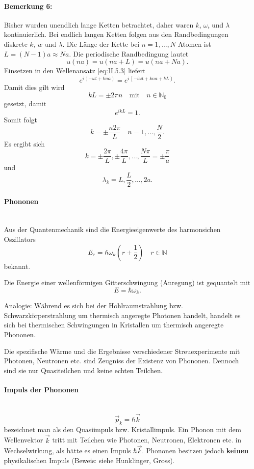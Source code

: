 \paragraph{Bemerkung 6:}
	Bisher wurden unendlich lange Ketten betrachtet, daher waren $k$, $\omega$, und $\lambda$ kontinuierlich.
	Bei endlich langen Ketten folgen aus den Randbedingungen diskrete $k$, $w$ und $\lambda$. 
	Die Länge der Kette bei $n=1,\ldots,N$ Atomen ist $L= \left( N-1 \right) a \approx Na$. 
	Die periodische Randbedingung lautet
	$$
	u\left( na \right)  = u\left( na + L \right)  = u\left( na + Na \right).
	$$ 
	Einsetzen in den Wellenansatz \eqref{eq:II.5.3} liefert
	$$
	e^{i\left( -\omega t + kna \right) } = e^{i\left( -i\omega t + kna + kL \right) }.
	$$ 
	Damit dies gilt wird
	$$
	kL = \pm 2 \pi n\quad\text{mit}\quad n \in \mathbb{N}_{0}
	$$ 
	gesetzt, damit
	$$
	e^{ikL} =1.
	$$
	Somit folgt
	$$
	k= \pm \frac{n 2\pi}{L} \quad n = 1,\ldots, \frac{N}{2}.
	$$ 
	Es ergibt sich
	$$
	k = \pm \frac{2\pi}{L}, \pm \frac{4\pi}{L}, \ldots , \frac{N\pi}{L} =\pm \frac{\pi}{a}
	$$ 
	und 
	$$
	\lambda_{k} = L, \frac{L}{2},\ldots, 2a.
	$$



\paragraph{Phononen}\,\\
	Aus der Quantenmechanik sind die Energieeigenwerte des harmonsichen Oszillators 
	\begin{equation}
		\label{eq:II.5.5}
		E_{r} = \hbar \omega_{k} \left( r +\frac{1}{2} \right) \quad r \in \mathbb{N}
	\end{equation}
	bekannt. 
	\begin{important}
		Die Energie einer wellenförmigen Gitterschwingung (Anregung) ist gequantelt mit
		$$
		E = \hbar \omega_{k}.
		$$ 
	\end{important}
	Analogie: Während es sich bei der Hohlraumstrahlung bzw. Schwarzkörperstrahlung um thermisch angeregte Photonen handelt, handelt es sich bei thermischen Schwingungen in Kristallen um thermisch angeregte Phononen.
	
	Die spezifische Wärme und die Ergebnisse verschiedener Streuexperimente mit Photonen, Neutronen etc. sind Zeugniss der Existenz von Phononen.
	Dennoch sind sie nur Quasiteilchen und keine echten Teilchen.

\paragraph{Impuls der Phononen}\,\\
	\begin{equation}
		\label{eq:II.5.6}
		\Vec{p}_{k} = \hbar \Vec{k}
	\end{equation}
	bezeichnet man als den Quasiimpuls bzw. Kristallimpuls. 
	Ein Phonon mit dem Wellenvektor $\Vec{k}$ tritt mit Teilchen wie Photonen, Neutronen, Elektronen etc. in Wechselwirkung, als hätte es einen Impuls $\hbar  \Vec{k}$. 
	Phononen besitzen jedoch \textbf{keinen} physikalischen Impuls (Beweis: siehe Hunklinger, Gross).

